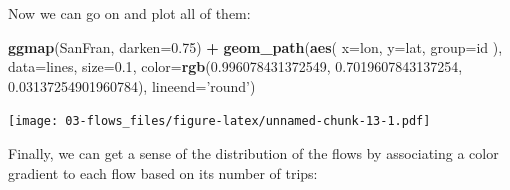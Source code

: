 \documentclass[]{book}
\newenvironment{Shaded}{\begin{snugshade}}{\end{snugshade}}
\newcommand{\DataTypeTok}[1]{\textcolor[rgb]{0.13,0.29,0.53}{#1}}
\newcommand{\FloatTok}[1]{\textcolor[rgb]{0.00,0.00,0.81}{#1}}
\newcommand{\KeywordTok}[1]{\textcolor[rgb]{0.13,0.29,0.53}{\textbf{#1}}}
\newcommand{\NormalTok}[1]{#1}
\newcommand{\OperatorTok}[1]{\textcolor[rgb]{0.81,0.36,0.00}{\textbf{#1}}}
\newcommand{\StringTok}[1]{\textcolor[rgb]{0.31,0.60,0.02}{#1}}
\begin{document}
Now we can go on and plot all of them:

\begin{Shaded}
\begin{Highlighting}[]
\KeywordTok{ggmap}\NormalTok{(SanFran, }\DataTypeTok{darken=}\FloatTok{0.75}\NormalTok{) }\OperatorTok{+}\StringTok{ }
\StringTok{  }\KeywordTok{geom_path}\NormalTok{(}\KeywordTok{aes}\NormalTok{(}
                \DataTypeTok{x=}\NormalTok{lon, }
                \DataTypeTok{y=}\NormalTok{lat,}
                \DataTypeTok{group=}\NormalTok{id}
\NormalTok{                ),}
            \DataTypeTok{data=}\NormalTok{lines,}
            \DataTypeTok{size=}\FloatTok{0.1}\NormalTok{,}
            \DataTypeTok{color=}\KeywordTok{rgb}\NormalTok{(}\FloatTok{0.996078431372549}\NormalTok{, }\FloatTok{0.7019607843137254}\NormalTok{, }\FloatTok{0.03137254901960784}\NormalTok{),}
            \DataTypeTok{lineend=}\StringTok{'round'}\NormalTok{)}
\end{Highlighting}
\end{Shaded}

\texttt{[image: 03-flows\_files/figure-latex/unnamed-chunk-13-1.pdf]}

Finally, we can get a sense of the distribution of the flows by associating a color gradient to each flow based on its number of trips:

\begin{Shaded}
\end{Shaded}
\end{document}
